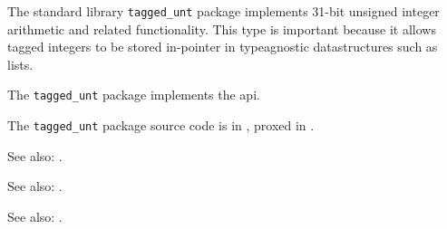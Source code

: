 
The standard library {\tt tagged\_unt} package implements 31-bit unsigned integer arithmetic and related 
functionality.  This type is important because it allows tagged integers to be stored in-pointer 
in typeagnostic datastructures such as lists.

The {\tt tagged\_unt} package implements the  api.

The {\tt tagged\_unt} package source code is in , 
proxed in .

See also: .

See also: .

See also: .
